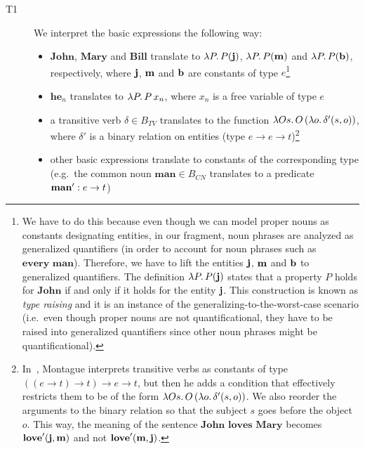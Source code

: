 \begin{description}
\item[T1] We interpret the basic expressions the following way:
  
  \begin{itemize}
  \item $\textbf{John}$, $\textbf{Mary}$ and $\textbf{Bill}$ translate to
    $\lambda P.\, P(\textbf{j})$, $\lambda P.\, P(\textbf{m})$ and $\lambda P.\, P(\textbf{b})$,
    respectively, where $\textbf{j}$, $\textbf{m}$ and $\textbf{b}$ are constants of
    type $e$\footnote{We have to do this because even though we can model
      proper nouns as constants designating entities, in our fragment, noun
      phrases are analyzed as generalized quantifiers (in order to account
      for noun phrases such as $\textbf{every man}$). Therefore, we have to
      lift the entities $\textbf{j}$, $\textbf{m}$ and $\textbf{b}$ to generalized
      quantifiers. The definition $\lambda P.\, P(\textbf{j})$ states that a
      property $P$ holds for $\textbf{John}$ if and only if it holds for
      the entity $\textbf{j}$. This construction is known as \emph{type
        raising} and it is an instance of the
      generalizing-to-the-worst-case scenario (i.e.\ even though proper
      nouns are not quantificational, they have to be raised into
      generalized quantifiers since other noun phrases might be
      quantificational).}

  \item $\textbf{he}_n$ translates to $\lambda P.\, P\,x_n$, where $x_n$
    is a free variable of type $e$

  \item a transitive verb $\delta \in B_{TV}$ translates to the function
    $\lambda O s.\, O\,(\lambda o.\, \delta'(s, o))$, where $\delta'$ is a
    binary relation on entities (type
    $e \to e \to t$)\footnote{In~\cite{montague1973proper}, Montague
      interprets transitive verbs as constants of type
      $((e \to t) \to t) \to e \to t$, but then he adds a condition that
      effectively restricts them to be of the form
      $\lambda O s.\, O\,(\lambda o.\, \delta'(s, o))$. We also reorder the
      arguments to the binary relation so that the subject $s$ goes before
      the object $o$. This way, the meaning of the sentence
      $\textbf{John loves Mary}$ becomes $\textbf{love}'(\textbf{j}, \textbf{m})$
      and not $\textbf{love}'(\textbf{m}, \textbf{j})$.}

  \item other basic expressions translate to constants of the corresponding
    type (e.g.\ the common noun $\textbf{man} \in B_{CN}$ translates to a
    predicate $\textbf{man}' : e \to t$)
  \end{itemize}


\end{description}
